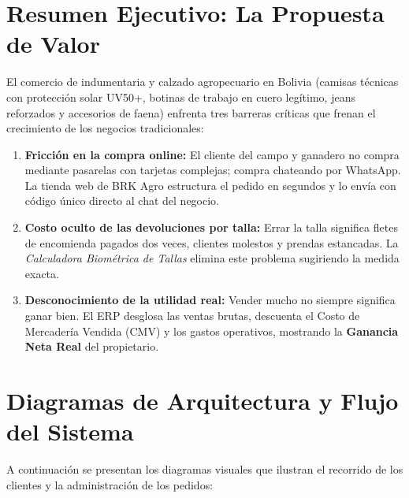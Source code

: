 \documentclass[11pt,a4paper]{article}
\begin{document}
\tableofcontents
\newpage

\section{Resumen Ejecutivo: La Propuesta de Valor}

El comercio de indumentaria y calzado agropecuario en Bolivia (camisas técnicas con protección solar UV50+, botinas de trabajo en cuero legítimo, jeans reforzados y accesorios de faena) enfrenta tres barreras críticas que frenan el crecimiento de los negocios tradicionales:

\begin{enumerate}
    \item \textbf{Fricción en la compra online:} El cliente del campo y ganadero no compra mediante pasarelas con tarjetas complejas; compra chateando por WhatsApp. La tienda web de BRK Agro estructura el pedido en segundos y lo envía con código único directo al chat del negocio.
    \item \textbf{Costo oculto de las devoluciones por talla:} Errar la talla significa fletes de encomienda pagados dos veces, clientes molestos y prendas estancadas. La \textit{Calculadora Biométrica de Tallas} elimina este problema sugiriendo la medida exacta.
    \item \textbf{Desconocimiento de la utilidad real:} Vender mucho no siempre significa ganar bien. El ERP desglosa las ventas brutas, descuenta el Costo de Mercadería Vendida (CMV) y los gastos operativos, mostrando la \textbf{Ganancia Neta Real} del propietario.
\end{enumerate}

\section{Diagramas de Arquitectura y Flujo del Sistema}

A continuación se presentan los diagramas visuales que ilustran el recorrido de los clientes y la administración de los pedidos:
\end{document}
